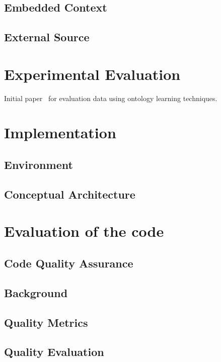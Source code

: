 \documentclass[draft,final]{vutinfth} %
\begin{document}
\section{Embedded Context}\label{sec:embedded_context}
\section{External Source}\label{sec:external_source}


\chapter{Experimental Evaluation}
Initial paper~\cite{liu2005semi} for evaluation data using ontology learning techniques.


\chapter{Implementation}\label{chap:implementation}
\section{Environment}
\section{Conceptual Architecture}




\chapter{Evaluation of the code}
\section{Code Quality Assurance}
\section{Background}
\section{Quality Metrics}
\section{Quality Evaluation}
\end{document}
